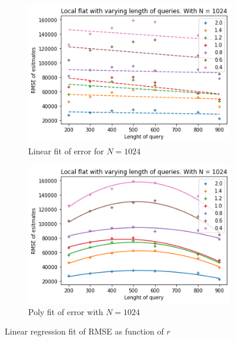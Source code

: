 \documentclass[11pt]{article}
\theoremstyle{definition}
\begin{document}
\begin{figure}[H]
\centering
\begin{subfigure}{.4\textwidth}
  \centering
  \includegraphics[width=\linewidth]{figures/local_flat/varying_r/loc_flat_varying_length_N_linear_=1024.png}
  \caption{Linear fit of error for $N=1024$}
  \label{fig:loc_r_sub1_lin_}
\end{subfigure}%
\begin{subfigure}{.4\textwidth}
  \centering
  \includegraphics[width=\linewidth]{figures/local_flat/varying_r/loc_flat_varying_length_N_poly_=1024.png}
  \caption{Poly fit of error with  $N=1024$}
  \label{fig:loc_r_sub3_lin__}
\end{subfigure}
\caption{Linear regression fit of RMSE as function of $r$}
\label{fig:plt_loc_r_lin_poly_1}
\end{figure}
\end{document}
